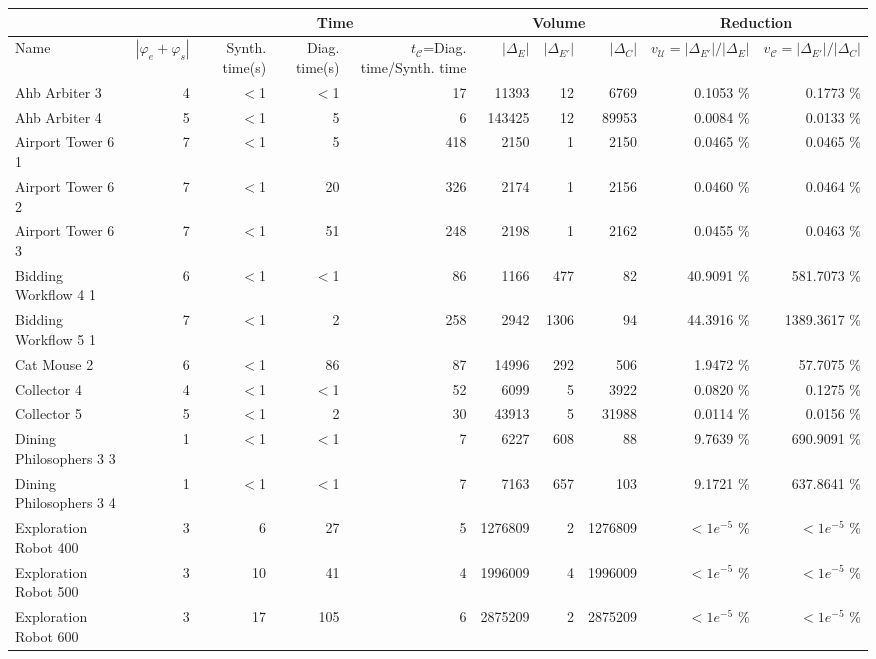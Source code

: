 \begin{tabular}{|l|r|rrr|rrr|rr|}
  \hline & & \multicolumn{3}{c|}{Time}&\multicolumn{3}{c|}{Volume} & \multicolumn{2}{c|}{Reduction}\\ \hline
Name & $|\varphi_e + \varphi_s|$ & Synth. time(s) & Diag. time(s) & $t_{\mathcal{C}}$=Diag. time/Synth. time & $|\Delta_E|$ & $|\Delta_{E'}|$ & $|\Delta_{C}|$ & $v_{\mathcal{U}}=|\Delta_{E'}|/|\Delta_{E}|$ & $v_{\mathcal{C}}=|\Delta_{E'}|/|\Delta_{C}|$ \\ 
  \hline
Ahb Arbiter 3 &   4 & $<$1 & $<$1 & 17 & 11393 & 12 & 6769 &  0.1053 \% &    0.1773 \% \\ 
  Ahb Arbiter 4 &   5 & $<$1 & 5 & 6 & 143425 & 12 & 89953 &  0.0084 \% &    0.0133 \% \\ 
  Airport Tower 6 1 &   7 & $<$1 & 5 & 418 & 2150 & 1 & 2150 &  0.0465 \% &    0.0465 \% \\ 
  Airport Tower 6 2 &   7 & $<$1 & 20 & 326 & 2174 & 1 & 2156 &  0.0460 \% &    0.0464 \% \\ 
  Airport Tower 6 3 &   7 & $<$1 & 51 & 248 & 2198 & 1 & 2162 &  0.0455 \% &    0.0463 \% \\ 
  Bidding Workflow 4 1 &   6 & $<$1 & $<$1 & 86 & 1166 & 477 &  82 & 40.9091 \% &  581.7073 \% \\ 
  Bidding Workflow 5 1 &   7 & $<$1 & 2 & 258 & 2942 & 1306 &  94 & 44.3916 \% & 1389.3617 \% \\ 
  Cat Mouse 2 &   6 & $<$1 & 86 & 87 & 14996 & 292 & 506 &  1.9472 \% &   57.7075 \% \\ 
  Collector 4 &   4 & $<$1 & $<$1 & 52 & 6099 & 5 & 3922 &  0.0820 \% &    0.1275 \% \\ 
  Collector 5 &   5 & $<$1 & 2 & 30 & 43913 & 5 & 31988 &  0.0114 \% &    0.0156 \% \\ 
  Dining Philosophers 3 3 &   1 & $<$1 & $<$1 & 7 & 6227 & 608 &  88 &  9.7639 \% &  690.9091 \% \\ 
  Dining Philosophers 3 4 &   1 & $<$1 & $<$1 & 7 & 7163 & 657 & 103 &  9.1721 \% &  637.8641 \% \\ 
  Exploration Robot 400 &   3 & 6 & 27 & 5 & 1276809 & 2 & 1276809 & $<1e^{-5}$ \% & $<1e^{-5}$ \% \\ 
  Exploration Robot 500 &   3 & 10 & 41 & 4 & 1996009 & 4 & 1996009 & $<1e^{-5}$ \% & $<1e^{-5}$ \% \\ 
  Exploration Robot 600 &   3 & 17 & 105 & 6 & 2875209 & 2 & 2875209 & $<1e^{-5}$ \% & $<1e^{-5}$ \% \\ 

\end{tabular}
